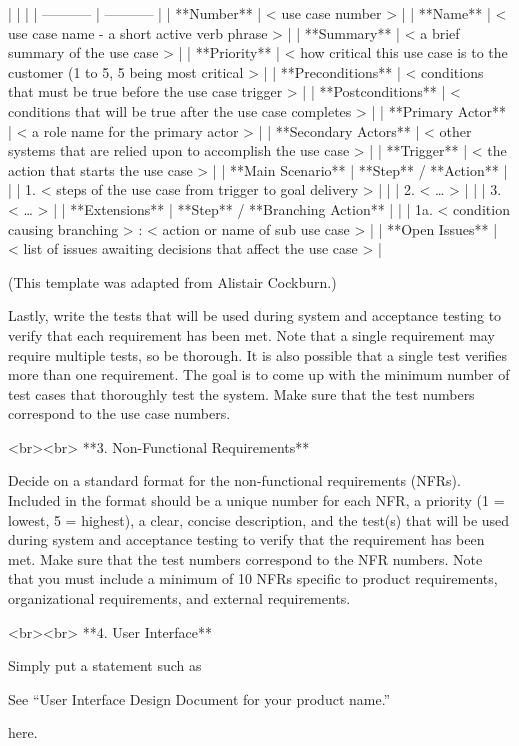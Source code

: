 \documentclass{article}
\begin{document}
| | |
| ----------- | ----------- |
| **Number** | < use case number > |
| **Name** | < use case name - a short active verb phrase > |
| **Summary** | < a brief summary of the use case > |
| **Priority** | < how critical this use case is to the customer (1 to 5, 5 being most critical > |
| **Preconditions** | < conditions that must be true before the use case trigger > |
| **Postconditions** | < conditions that will be true after the use case completes > |
| **Primary Actor** | < a role name for the primary actor > |
| **Secondary Actors** | < other systems that are relied upon to accomplish the use case > |
| **Trigger** | < the action that starts the use case > |
| **Main Scenario** | **Step** / **Action** |
| | 1.  < steps of the use case from trigger to goal delivery > |
| | 2.  < … > |
| | 3.  < … > |
| **Extensions** | **Step** / **Branching Action** |
| | 1a.  < condition causing branching > : < action or name of sub use case > |
| **Open Issues** | < list of issues awaiting decisions that affect the use case > |


(This template was adapted from Alistair Cockburn.) 

Lastly, write the tests that will be used during system and acceptance testing to verify that each requirement has been met.  Note that a single requirement may require multiple tests, so be thorough.  It is also possible that a single test verifies more than one requirement.  The goal is to come up with the minimum number of test cases that thoroughly test the system.  Make sure that the test numbers correspond to the use case numbers.

<br><br>
**3.  Non-Functional Requirements**

Decide on a standard format for the non-functional requirements (NFRs).  Included in the format should be a unique number for each NFR, a priority (1 = lowest, 5 = highest), a clear, concise description, and the test(s) that will be used during system and acceptance testing to verify that the requirement has been met.  Make sure that the test numbers correspond to the NFR numbers. Note that you must include a minimum of 10 NFRs specific to product requirements, organizational requirements, and external requirements. 

<br><br>
**4.  User Interface**

Simply put a statement such as 

See “User Interface Design Document for your product name.”

here.  
\end{document}
